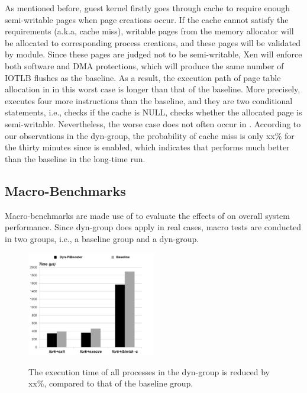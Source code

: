 
 As mentioned before, guest kernel firstly goes through \name cache to require enough semi-writable pages when page creations occur. If the cache cannot satisfy the requirements (a.k.a, cache miss), writable pages from the memory allocator will be allocated to corresponding process creations, and these pages will be validated by \name module. Since these pages are judged not to be semi-writable, Xen will enforce both software and DMA protections, which will produce the same number of IOTLB flushes as the baseline. As a result, the execution path of page table allocation in \name in this worst case is longer than that of the baseline. More precisely, \name executes four more instructions than the baseline, and they are two conditional statements, i.e., \name checks if the cache is NULL, \name checks whether the allocated page is semi-writable. Nevertheless, the worse case does not often occur in \name. According to our observations in the dyn-\name group, the probability of cache miss is only xx\% for the thirty minutes since \name is enabled, which indicates that \name performs much better than the baseline in the long-time run.


\subsection{Macro-Benchmarks}

Macro-benchmarks are made use of to evaluate the effects of \name on overall system performance. Since dyn-\name group does apply in real cases, macro tests are conducted in two groups, i.e., a baseline group and a dyn-\name group.

\begin{figure}[htp]
\centering
\includegraphics[width=0.5\textwidth]{image/macro/lmbench.png} \\
\caption{The execution time of all processes in the dyn-\name group is reduced by xx\%, compared to that of the baseline group.}
\label{fig:lmbench}
\end{figure}

